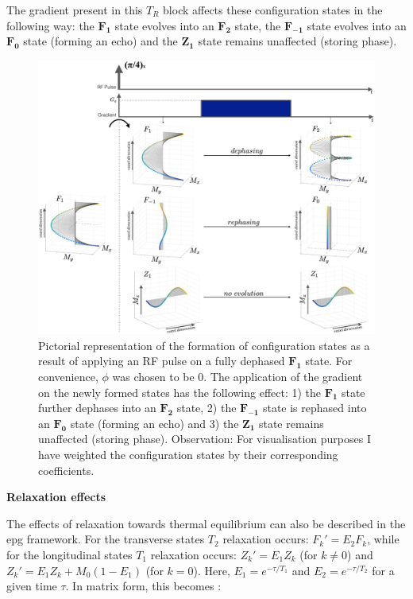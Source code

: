 The gradient present in this $T_R$ block affects these configuration states in the following way:
the $\bm{F_1}$ state evolves into an $\bm{F_2}$ state,
the $\bm{F_{-1}}$ state evolves into an $\bm{F_0}$ state (forming an echo) and
the $\bm{Z_{1}}$ state remains unaffected (storing phase).

\begin{figure}[ht]
    \centering
    \includegraphics[angle=0,width=1\textwidth, keepaspectratio]{images/mrf/oneblockfispGeneral}
    \caption{Pictorial representation of the formation of configuration states as a result of applying an RF pulse on a fully dephased $\bm{F_1}$ state.
    For convenience, $\phi$ was chosen to be 0.
    The application of the gradient on the newly formed states has the following effect:
    1) the $\bm{F_1}$ state further dephases into an $\bm{F_2}$ state,
    2) the $\bm{F_{-1}}$ state is rephased into an $\bm{F_0}$ state (forming an echo) and
    3) the $\bm{Z_{1}}$ state remains unaffected (storing phase).
    Observation: For visualisation purposes I have weighted the configuration states by their corresponding coefficients.
    }
    \label{fig:oneblockfispGeneral}
\end{figure}

\hfill

\textbf{Relaxation effects} 

The effects of relaxation towards thermal equilibrium can also be described in the \ac{epg} framework.
For the transverse states $T_2$ relaxation occurs: $F_k' = E_2 F_k$, while for the longitudinal states $T_1$ relaxation occurs: $Z_k' = E_1 Z_k$ (for $k \neq 0$)
and $Z_k' = E_1 Z_k + M_0(1 - E_1)$ (for $k = 0$).
Here, $E_1 = e^{-\tau/T_1}$ and $E_2 = e^{-\tau/T_2}$ for a given time $\tau$.
In matrix form, this becomes \cite{Hennig1991}:

